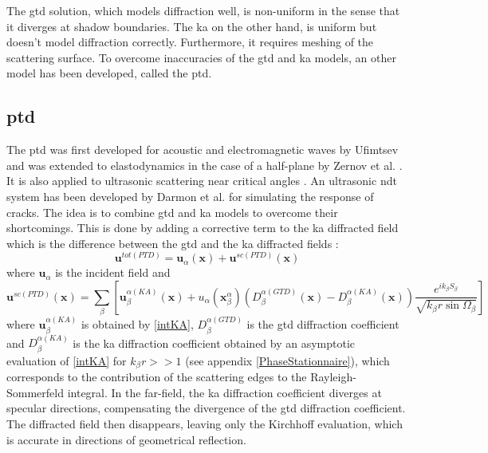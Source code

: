 The \acrshort{gtd} solution, which models diffraction well, is non-uniform in the sense that it diverges at shadow boundaries. The \acrshort{ka} on the other hand, is uniform but doesn't model diffraction correctly. Furthermore, it requires meshing of the scattering surface. To overcome inaccuracies of the \acrshort{gtd} and \acrshort{ka} models, an other model has been developed, called the \acrfull{ptd}.

\subsection{\acrfull{ptd}}
The \acrfull{ptd} was first developed for acoustic and electromagnetic waves by Ufimtsev \cite{Ufmi} and was extended to elastodynamics in the case of a half-plane by Zernov et al. \cite{Zernov}. It is also applied to ultrasonic scattering near critical angles \cite{systmodel,FradkinDarmon}. An ultrasonic \acrshort{ndt} system has been  developed by Darmon et al. \cite{systmodel} for simulating the response of cracks. The idea is to combine \acrshort{gtd} and \acrshort{ka} models to overcome their shortcomings. This is done by adding a corrective term to the \acrshort{ka} diffracted field which is the difference between the \acrshort{gtd} and the \acrshort{ka} diffracted fields :
\begin{equation}
\mathbf{u}^{tot (PTD)}=\mathbf{u}_{\alpha}(\mathbf{x})+\mathbf{u}^{sc (PTD)}(\mathbf{x})
\end{equation}
where $\mathbf{u}_{\alpha}$ is the incident field and
\begin{equation}
\mathbf{u}^{sc (PTD)}(\mathbf{x})=\sum_{\beta}\left[\mathbf{u}^{\alpha(KA)}_{\beta}(\mathbf{x})+u_{\alpha}(\mathbf{x}_{\beta}^{\alpha})\left(D_{\beta}^{\alpha(GTD)}(\mathbf{x})-D_{\beta}^{\alpha(KA)}(\mathbf{x})\right)\dfrac{e^{ik_{\beta}S_{\beta}}}{\sqrt{k_{\beta}r\sin\Omega_{\beta}}}\right]
\label{eqPTD}
\end{equation}
where  $\mathbf{u}^{\alpha(KA)}_{\beta}$ is obtained by \eqref{intKA}, $D_{\beta}^{\alpha(GTD)}$ is the \acrshort{gtd} diffraction coefficient and $D_{\beta}^{\alpha(KA)}$ is the \acrshort{ka} diffraction coefficient obtained by an asymptotic evaluation of \eqref{intKA} for $k_{\beta}r>>1$ (see appendix \ref{PhaseStationnaire}), which corresponds to the contribution of the scattering edges to the Rayleigh-Sommerfeld integral. In the far-field, the \acrshort{ka} diffraction coefficient diverges at specular directions, compensating the divergence of the \acrshort{gtd} diffraction coefficient. The diffracted field then disappears, leaving only the Kirchhoff evaluation, which is accurate in directions of geometrical reflection.

